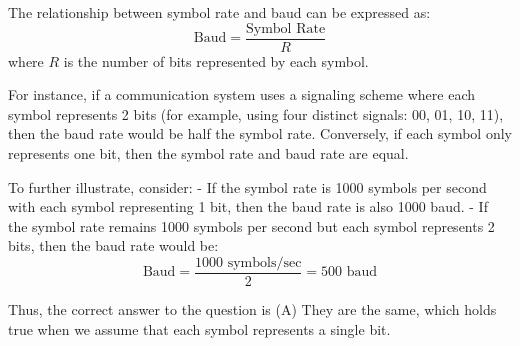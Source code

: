 The relationship between symbol rate and baud can be expressed as:
\[
\text{Baud} = \frac{\text{Symbol Rate}}{R}
\]
where \( R \) is the number of bits represented by each symbol. 

For instance, if a communication system uses a signaling scheme where each symbol represents 2 bits (for example, using four distinct signals: 00, 01, 10, 11), then the baud rate would be half the symbol rate. Conversely, if each symbol only represents one bit, then the symbol rate and baud rate are equal.

To further illustrate, consider:
- If the symbol rate is 1000 symbols per second with each symbol representing 1 bit, then the baud rate is also 1000 baud.
- If the symbol rate remains 1000 symbols per second but each symbol represents 2 bits, then the baud rate would be:
\[
\text{Baud} = \frac{1000 \text{ symbols/sec}}{2} = 500 \text{ baud}
\]

Thus, the correct answer to the question is (A) They are the same, which holds true when we assume that each symbol represents a single bit.

